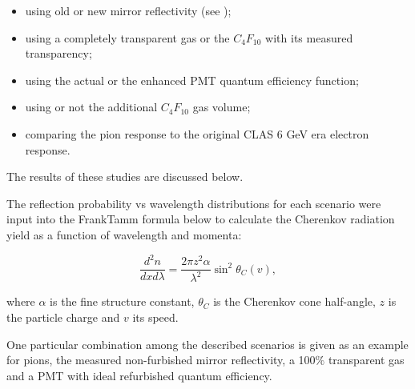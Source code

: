 \begin{itemize}
	\item using old or new mirror reflectivity (see );
	\item using a completely transparent gas or the $C_4F_{10}$ with its measured transparency;
	\item using the actual or the enhanced PMT quantum efficiency function;
	\item using or not the additional $C_4F_{10}$ gas volume;
	\item comparing the pion response to the original CLAS 6 GeV era electron response.
\end{itemize}

The results of these studies are discussed below.

The reflection probability vs wavelength distributions for each scenario were input into
the Frank\textendash Tamm formula \cite{Frank:1937fk} below to calculate
the Cherenkov radiation yield as a function of wavelength and momenta:


\begin{equation} \label{eq:cerenkov}
	\frac{d^2n}{dxd\lambda} = \frac{2\pi z^2\alpha}{\lambda^2}\sin^2{\theta_C(v)},
\end{equation}

\noindent
where $\alpha$ is the fine structure constant, $\theta_C$ is the Cherenkov cone half-angle, $z$ is the particle charge and $v$ its speed.

One particular combination among the described scenarios is given as an example  for pions,
the measured non-furbished mirror reflectivity, a 100$\%$ transparent gas and a PMT with ideal refurbished quantum efficiency.

